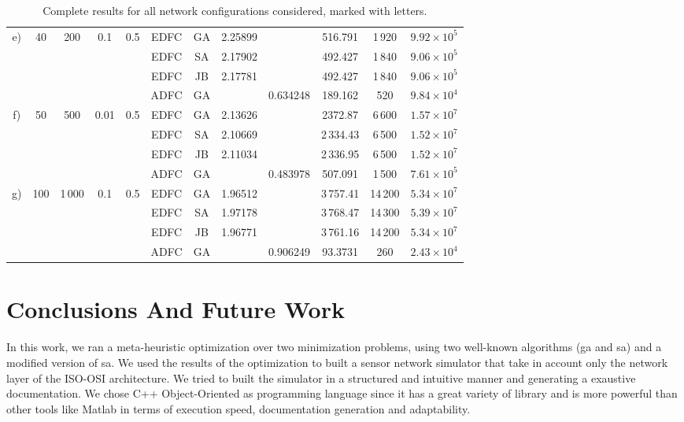 \documentclass[12pt,journal,draftclsnofoot,onecolumn]{IEEEtran}
\begin{document}
\begin{table}[h]
\begin{tabular}{c c c c c c c c c c c c}
		\multirow{4}{*}{e)} & \multirow{4}{*}{40} & \multirow{4}{*}{200} & \multirow{4}{*}{0.1} & \multirow{4}{*}{0.5}
						&EDFC & GA & 2.25899 &  & 516.791 & 1\,920 & $9.92 \times 10^5$ \\
		&&&& &EDFC & SA & 2.17902 &  & 492.427 & 1\,840 & $9.06 \times 10^5$ \\
		&&&& &EDFC & JB & 2.17781 &  & 492.427 & 1\,840 & $9.06 \times 10^5$ \\
		&&&& &ADFC & GA &  & 0.634248 & 189.162 & 520 & $9.84 \times 10^4$ \\ \cmidrule{2-12}
		\multirow{4}{*}{f)} & \multirow{4}{*}{50} & \multirow{4}{*}{500} & \multirow{4}{*}{0.01} & \multirow{4}{*}{0.5}
						&EDFC & GA & 2.13626 &  & 2372.87 & 6\,600 & $1.57 \times 10^7$ \\
		&&&& &EDFC & SA & 2.10669 &  & 2\,334.43 & 6\,500 & $1.52 \times 10^7$ \\
		&&&& &EDFC & JB & 2.11034 &  & 2\,336.95 & 6\,500 & $1.52 \times 10^7$ \\
		&&&& &ADFC & GA &  & 0.483978 & 507.091 & 1\,500 & $7.61 \times 10^5$ \\ \cmidrule{2-12}
		\multirow{4}{*}{g)} & \multirow{4}{*}{100} & \multirow{4}{*}{1\,000} & \multirow{4}{*}{0.1} & \multirow{4}{*}{0.5}
						&EDFC & GA & 1.96512 &  & 3\,757.41 & 14\,200 & $5.34 \times 10^7$ \\
		&&&& &EDFC & SA & 1.97178 &  & 3\,768.47 & 14\,300 & $5.39 \times 10^7$ \\
		&&&& &EDFC & JB & 1.96771 &  & 3\,761.16 & 14\,200 & $5.34 \times 10^7$ \\
		&&&& &ADFC & GA &  & 0.906249 & 93.3731 & 260 & $2.43 \times 10^4$ \\  \bottomrule
	\end{tabular}
	\caption{Complete results for all network configurations considered, marked with letters.}
	\label{tab:results}
\end{table}


\section{Conclusions And Future Work}\label{sec:conclusions}
In this work, we ran a meta-heuristic optimization over two minimization problems, using two well-known algorithms (\gls{ga} and \gls{sa}) and a modified version of \gls{sa}.
We used the results of the optimization to built a sensor network simulator that take in account only the network layer of the ISO-OSI architecture.
We tried to built the simulator in a structured and intuitive manner and generating a exaustive documentation.
We chose C++ Object-Oriented as programming language since it has a great variety of library and is more powerful than other tools like Matlab in terms of execution speed, documentation generation and adaptability.



\end{document}
